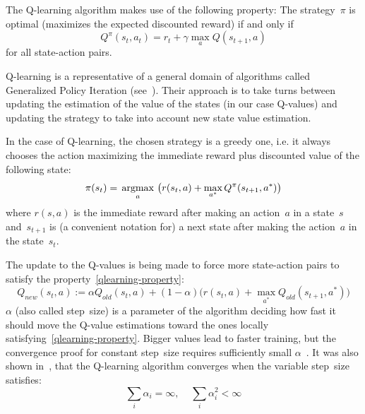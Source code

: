The Q-learning algorithm makes use of the following property:
The strategy~$\pi$ is optimal (maximizes the expected discounted reward) if and only if
\begin{equation}\label{qlearning-property}
  Q^\pi(s_t, a_t) = r_t + \gamma \max_a Q(s_{t+1}, a)
\end{equation}
for all state-action pairs.

Q-learning is a representative of a general domain of algorithms called Generalized Policy Iteration (see~\cite[Chapter~4.6.]{reinforcement-book}). Their approach is to take turns between updating the estimation of the value of the states (in our case Q-values) and updating the strategy to take into account new state value estimation.
 
In the case of Q-learning, the chosen strategy is a greedy one, i.e. it always chooses the action maximizing the immediate reward plus discounted value of the following state:
\begin{equation}
  \pi(s_t) = \operatorname*{\,\operatorname{argmax}\,}_a \big(r(s_t, a) + \max_{a^*} Q^\pi(s_{t+1}, a^*)\big)
\end{equation}
where $r(s, a)$ is the immediate reward after making an action~$a$ in a state~$s$ and~$s_{t+1}$ is (a convenient notation for) a next state after making the action~$a$ in the state~$s_t$.

The update to the Q-values is being made to force more state-action pairs to satisfy the property~\eqref{qlearning-property}:
\begin{equation}
  Q_{new}(s_t, a) := \alpha Q_{old}(s_t, a) + (1 - \alpha)\big(r(s_t, a) + \max_{a^*} Q_{old}(s_{t+1}, a^*)\big)
\end{equation}
$\alpha$ (also called step~size) is a parameter of the algorithm deciding how fast it should move the Q-value estimations toward the ones locally satisfying~\eqref{qlearning-property}. Bigger values lead to faster training, but the convergence proof for constant step~size requires sufficiently small $\alpha$~\cite[section~3.]{qlearning-old}. It was also shown in~\cite{qlearning-convergence}, that the Q-learning algorithm converges when the variable step~size satisfies:
\begin{equation}
  \sum_i \alpha_i = \infty, \;\;\;\; \sum_i \alpha_i^2 < \infty
\end{equation}

